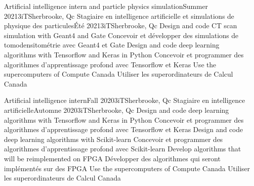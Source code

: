     \resumeSubheadingEnFr
        {Artificial intelligence intern and particle physics simulation}{Summer 2021}{3iT}{Sherbrooke, Qc}
        {Stagiaire en intelligence artificielle et simulations de physique des particules}{Été 2021}{3iT}{Sherbrooke, Qc}
            \resumeItemListStart
                \resumeItemEnFr
                    {Design and code CT scan simulation with Geant4 and Gate}
                    {Concevoir et développer des simulations de tomodensitométrie avec Geant4 et Gate}
                \resumeItemEnFr
                    {Design and code deep learning algorithms with Tensorflow and Keras in Python}
                    {Concevoir et programmer des algorithmes d’apprentissage profond avec Tensorflow et Keras}
                \resumeItem
                    {Use the supercomputers of Compute Canada}
                    {Utiliser les superordinateurs de Calcul Canada}
            \resumeItemListEnd

    \resumeSubheadingEnFr
        {Artificial intelligence intern}{Fall 2020}{3iT}{Sherbrooke, Qc}
        {Stagiaire en intelligence artificielle}{Automne 2020}{3iT}{Sherbrooke, Qc}
            \resumeItemListStart
                \resumeItemEnFr
                    {Design and code deep learning algorithms with Tensorflow and Keras in Python}
                    {Concevoir et programmer des algorithmes d’apprentissage profond avec Tensorflow et Keras}
                \resumeItemEnFr
                    {Design and code deep learning algorithms with Scikit-learn}
                    {Concevoir et programmer des algorithmes d'apprentissage profond avec Scikit-learn}
                \resumeItemEnFr
                    {Develop algorithms that will be reimplemented on FPGA}
                    {Développer des algorithmes qui seront implémentés sur des FPGA}
                \resumeItemEnFr
                    {Use the supercomputers of Compute Canada}
                    {Utiliser les superordinateurs de Calcul Canada}
            \resumeItemListEnd
        
